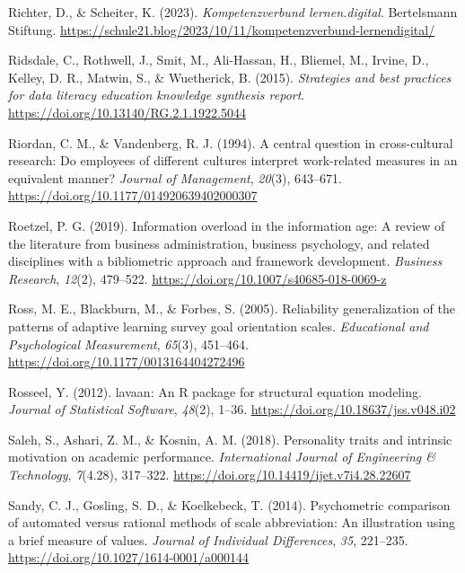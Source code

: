 \documentclass[
  12pt,
  a4paper,
  twoside]{article}
\newlength{\cslhangindent}
\newenvironment{CSLReferences}[2] %
 {\begin{list}{}{%
  \setlength{\itemindent}{0pt}
  \setlength{\leftmargin}{0pt}
  \setlength{\parsep}{0pt}
  \ifodd #1
   \setlength{\leftmargin}{\cslhangindent}
   \setlength{\itemindent}{-1\cslhangindent}
  \fi
  \setlength{\itemsep}{#2\baselineskip}}}
 {\end{list}}
\begin{document}
\begin{CSLReferences}{1}{0}
Richter, D., \& Scheiter, K. (2023). \emph{Kompetenzverbund lernen.digital}. Bertelsmann Stiftung. \url{https://schule21.blog/2023/10/11/kompetenzverbund-lernendigital/}

Ridsdale, C., Rothwell, J., Smit, M., Ali-Hassan, H., Bliemel, M., Irvine, D., Kelley, D. R., Matwin, S., \& Wuetherick, B. (2015). \emph{Strategies and best practices for data literacy education knowledge synthesis report}. \url{https://doi.org/10.13140/RG.2.1.1922.5044}

Riordan, C. M., \& Vandenberg, R. J. (1994). A central question in cross-cultural research: Do employees of different cultures interpret work-related measures in an equivalent manner? \emph{Journal of Management}, \emph{20}(3), 643--671. \url{https://doi.org/10.1177/014920639402000307}

Roetzel, P. G. (2019). Information overload in the information age: A review of the literature from business administration, business psychology, and related disciplines with a bibliometric approach and framework development. \emph{Business Research}, \emph{12}(2), 479--522. \url{https://doi.org/10.1007/s40685-018-0069-z}

Ross, M. E., Blackburn, M., \& Forbes, S. (2005). Reliability generalization of the patterns of adaptive learning survey goal orientation scales. \emph{Educational and Psychological Measurement}, \emph{65}(3), 451--464. \url{https://doi.org/10.1177/0013164404272496}

Rosseel, Y. (2012). {lavaan}: An {R} package for structural equation modeling. \emph{Journal of Statistical Software}, \emph{48}(2), 1--36. \url{https://doi.org/10.18637/jss.v048.i02}

Saleh, S., Ashari, Z. M., \& Kosnin, A. M. (2018). Personality traits and intrinsic motivation on academic performance. \emph{International Journal of Engineering \& Technology}, \emph{7}(4.28), 317--322. \url{https://doi.org/10.14419/ijet.v7i4.28.22607}

Sandy, C. J., Gosling, S. D., \& Koelkebeck, T. (2014). Psychometric comparison of automated versus rational methods of scale abbreviation: An illustration using a brief measure of values. \emph{Journal of Individual Differences}, \emph{35}, 221--235. \url{https://doi.org/10.1027/1614-0001/a000144}


\end{CSLReferences}
\end{document}
